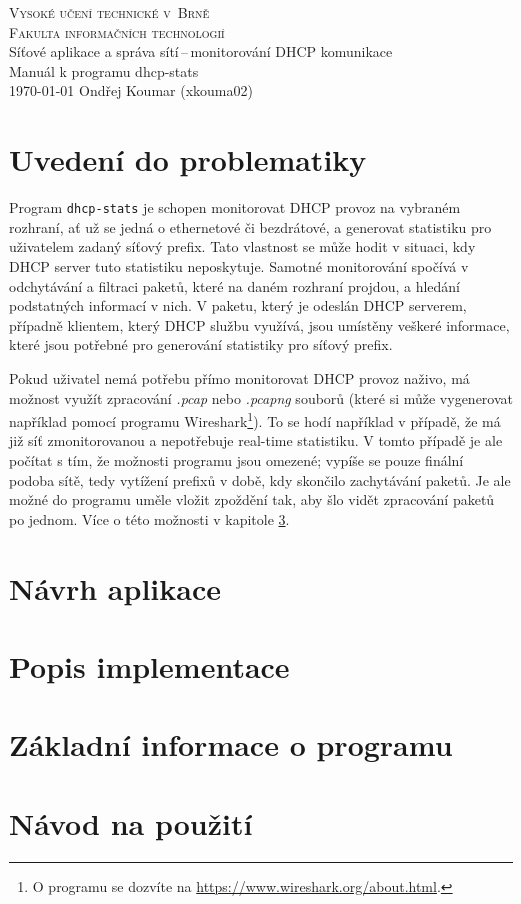 \documentclass[a4paper, 11pt, hidelinks]{article}
\begin{document}
\begin{titlepage}
    \begin{center}
        \Huge \textsc{Vysoké učení technické v~Brně} \\
        \huge \textsc{Fakulta informačních technologií} \\
        Síťové aplikace a správa sítí\,--\,monitorování DHCP komunikace\\
        \Huge  Manuál k programu dhcp-stats\\
        \Large \today{} \hfill Ondřej Koumar (xkouma02)
    \end{center}
\end{titlepage}

\tableofcontents

\newpage

\section{Uvedení do problematiky}\label{1_problematika}
Program \texttt{dhcp-stats} je schopen monitorovat DHCP provoz na vybraném rozhraní, ať už se jedná o ethernetové či bezdrátové, a generovat statistiku pro uživatelem zadaný síťový prefix.
Tato vlastnost se může hodit v situaci, kdy DHCP server tuto statistiku neposkytuje. 
Samotné monitorování spočívá v odchytávání a filtraci paketů, které na daném rozhraní projdou, a hledání podstatných informací v nich.
V paketu, který je odeslán DHCP serverem, případně klientem, který DHCP službu využívá, jsou umístěny veškeré informace, které jsou potřebné pro generování statistiky pro síťový prefix.

Pokud uživatel nemá potřebu přímo monitorovat DHCP provoz naživo, má možnost využít zpracování \emph{.pcap} nebo \emph{.pcapng} souborů (které si může vygenerovat například pomocí programu Wireshark\footnote{O programu se dozvíte na \href{https://www.wireshark.org/about.html}{https://www.wireshark.org/about.html}.}).
To se hodí například v případě, že má již síť zmonitorovanou a nepotřebuje real-time statistiku.
V tomto případě je ale počítat s tím, že možnosti programu jsou omezené; vypíše se pouze finální podoba sítě, tedy vytížení prefixů v době, kdy skončilo zachytávání paketů.
Je ale možné do programu uměle vložit zpoždění tak, aby šlo vidět zpracování paketů po jednom.
Více o této možnosti v kapitole \ref{3_popis}.

\section{Návrh aplikace}\label{2_navrh}

\section{Popis implementace}\label{3_popis}

\section{Základní informace o programu}\label{4_zakladni_info}

\section{Návod na použití}\label{5_navod}
\end{document}
